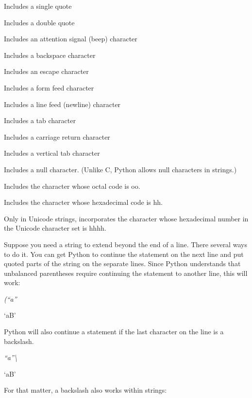 Includes a single quote



Includes a double quote



Includes an attention signal (beep)
character



Includes a backspace character



Includes an escape character



Includes a form feed character



Includes a line feed (newline)
character



Includes a tab character



Includes a carriage return
character



Includes a vertical tab character



Includes a null character. (Unlike
C, Python allows null characters in strings.)



Includes the character whose octal
code is oo.



Includes the character whose
hexadecimal code is hh.



Only in Unicode strings,
incorporates the character whose hexadecimal number in the Unicode
character set is hhhh.

Suppose you need a string to extend
beyond the end of a line. There several ways to do it. You can get
Python to continue the statement on the next line and put quoted parts
of the string on the separate lines. Since Python understands that
unbalanced parentheses require continuing the statement to another line,
this will work:


\emph{(``a''}



`aB'

Python will also continue a
statement if the last character on the line is a backslash.


\emph{``a''\textbackslash{}}



`aB'

For that matter, a backslash also
works within strings:


